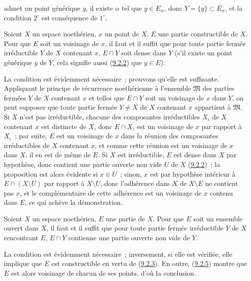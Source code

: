 admet un point générique $y$, il existe $\alpha$ tel que $y\in E_\alpha$,
donc $Y=\overline{\{y\}}\subset\overline{E_\alpha}$, et la condition
$2^\circ$ est conséquence de $1^\circ$.

\begin{proposition}[9.2.5]
\label{0.9.2.5-fr}
Soient $X$ un espace noethérien, $x$ un point de $X$, $E$ une partie
constructible de $X$. Pour que $E$ soit un voisinage de $x$, il faut et il
suffit que pour toute partie fermée irréductible $Y$ de $X$ contenant $x$,
$E\cap Y$ soit dense dans $Y$ (s'il existe un point générique $y$ de $Y$,
cela signifie aussi (\hyperref[0.9.2.2-fr]{9.2.2}) que $y\in E$).
\end{proposition}

La condition est évidemment nécessaire~; prouvons qu'elle est suffisante.
Appliquant le principe de récurrence noethérienne à l'ensemble $\mathfrak{M}$
des parties fermées $Y$ de $X$ contenant $x$ et telles que $E\cap Y$ soit un
voisinage de $x$ dans $Y$, on peut supposer que toute partie fermée $Y\ne X$
de $X$ contenant $x$ appartient à $\mathfrak{M}$. Si $X$ n'est pas
irréductible, chacune des composantes irréductibles $X_i$ de $X$ contenant
$x$ est distincte de $X$, donc $E\cap X_i$ est un voisinage de $x$ par
rapport à $X_i$~; par suite, $E$ est un voisinage de $x$ dans la réunion des
composantes irréductibles de $X$ contenant $x$, et comme cette réunion est un
voisinage de $x$ dans $X$, il en est de même de $E$. Si $X$ est
irréductible, $E$ est dense dans $X$ par hypothèse, donc contient une partie
ouverte non vide $U$ de $X$ (\hyperref[0.9.2.2-fr]{9.2.2})~; la proposition
est alors évidente si $x\in U$~; sinon, $x$ est par hypothèse intérieur à
$E\cap(X\setminus U)$ par rapport à $X\setminus U$, donc l'adhérence dans
$X$ de $X\setminus E$ ne contient pas $x$, et le complémentaire de cette
adhérence est un voisinage de $x$ contenu dans $E$, ce qui achève la
démonstration.

\begin{corollary}[9.2.6]
\label{0.9.2.6-fr}
Soient $X$ un espace noethérien, $E$ une partie de $X$. Pour que $E$ soit un
ensemble ouvert dans $X$, il faut et il suffit que pour toute partie fermée
irréductible $Y$ de $X$ rencontrant $E$, $E\cap Y$ contienne une partie
ouverte non vide de $Y$.
\end{corollary}

La condition est évidemment nécessaire~; inversement, si elle est vérifiée,
elle implique que $E$ est constructible en vertu de
(\hyperref[0.9.2.3-fr]{9.2.3}). En outre,
(\hyperref[0.9.2.5-fr]{9.2.5}) montre que $E$ est alors voisinage de chacun
de ses points, d'où la conclusion.

